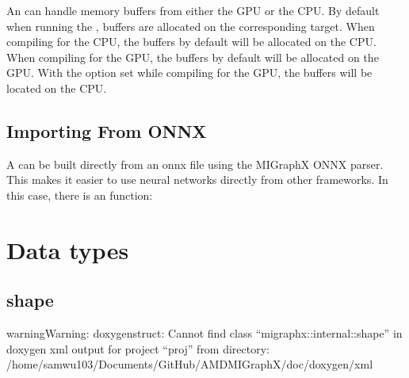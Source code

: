 \documentclass[letterpaper,10pt,english]{sphinxmanual}
\begin{document}
\begin{sphinxVerbatim}[commandchars=\\\{\}]
\end{sphinxVerbatim}

\sphinxAtStartPar
An  can handle memory buffers from either the GPU or the CPU.
By default when running the , buffers are allocated on the corresponding target.
When compiling for the CPU, the buffers by default will be allocated on the CPU.
When compiling for the GPU, the buffers by default will be allocated on the GPU.
With the option  set while compiling for the GPU, the buffers will be located on the CPU.


\subsection{Importing From ONNX}
\label{\detokenize{dev_intro:importing-from-onnx}}
\sphinxAtStartPar
A  can be built directly from an onnx file using the MIGraphX ONNX parser.
This makes it easier to use neural networks directly from other frameworks.
In this case, there is an  function:

\begin{sphinxVerbatim}[commandchars=\\\{\}]
\end{sphinxVerbatim}


\section{Data types}
\label{\detokenize{dev/data:data-types}}\label{\detokenize{dev/data::doc}}

\subsection{shape}
\label{\detokenize{dev/data:shape}}
\begin{sphinxadmonition}{warning}{Warning:}
\sphinxAtStartPar
doxygenstruct: Cannot find class “migraphx::internal::shape” in doxygen xml output for project “proj” from directory: /home/samwu103/Documents/GitHub/AMDMIGraphX/doc/doxygen/xml
\end{sphinxadmonition}
\end{document}
